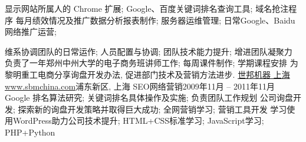           {显示网站所属人的 Chrome 扩展; Google、百度关键词排名查询工具; 域名抢注程序 }
          {每月绩效情况及推广数据分析报表制作; 服务器运维管理; 日常Google、Baidu网络推广运营;}

          {维系协调团队的日常运作; 人员配置与协调; 团队技术能力提升; 增进团队凝聚力}
          {负责了一年郑州中州大学的电子商务班讲师工作; 每周课件制作; 学期课程安排}
          {为黎明重工电商分享询盘开发办法, 促进部门技术及营销方法进步.}
      \resumeItemListEnd
    \resumeSubheading
      {\href{http://www.shibangchina.com/}{世邦机器 上海 www.sbmchina.com}}{浦东新区, 上海}
      {SEO网络营销}{2009年11月 -- 2011年11月}
      \resumeItemListStart
          {Google 排名算法研究; 关键词排名具体操作及实施; 负责团队工作规划}
          {公司询盘开发; 探索新的询盘开发策略并取得巨大成功; 全网营销学习; 营销工具开发}
          {学习使用WordPress助力公司技术提升; HTML+CSS标准学习; JavaScript学习; PHP+Python}
      \resumeItemListEnd
  \resumeSubHeadingListEnd
